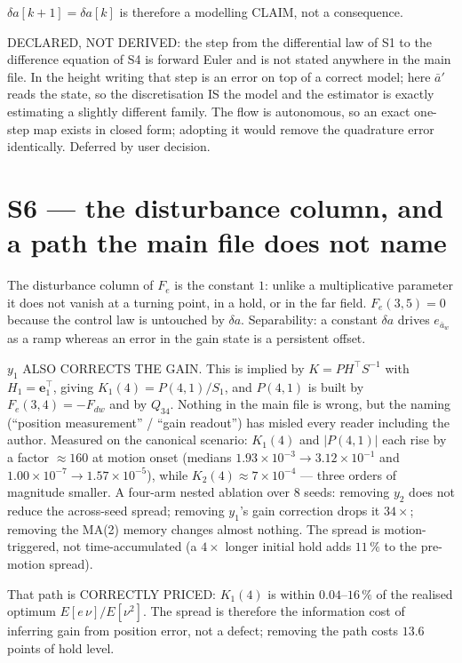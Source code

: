 \documentclass[11pt,a4paper,fontset=none]{ctexart}
\newcommand{\ba}{\bar{a}}
\begin{document}
$\delta a[k+1] = \delta a[k]$ is therefore a modelling CLAIM, not a consequence.

DECLARED, NOT DERIVED: the step from the differential law of S1 to the
difference equation of S4 is forward Euler and is not stated anywhere in the
main file. In the height writing that step is an error on top of a correct
model; here $\ba'$ reads the state, so the discretisation IS the model and the
estimator is exactly estimating a slightly different family. The flow is
autonomous, so an exact one-step map exists in closed form; adopting it would
remove the quadrature error identically. Deferred by user decision.

\section*{S6 --- the disturbance column, and a path the main file does not name}

The disturbance column of $F_e$ is the constant $1$: unlike a multiplicative
parameter it does not vanish at a turning point, in a hold, or in the far
field. $F_e(3,5) = 0$ because the control law is untouched by $\delta a$.
Separability: a constant $\delta a$ drives $e_{\ba_w}$ as a ramp whereas an
error in the gain state is a persistent offset.

$y_1$ ALSO CORRECTS THE GAIN. This is implied by $K = PH^{\top}S^{-1}$ with
$H_1 = \mathbf{e}_1^{\top}$, giving $K_1(4) = P(4,1)/S_1$, and $P(4,1)$ is built
by $F_e(3,4) = -F_{dw}$ and by $Q_{34}$. Nothing in the main file is wrong, but
the naming (``position measurement'' / ``gain readout'') has misled every
reader including the author. Measured on the canonical scenario:
$K_1(4)$ and $|P(4,1)|$ each rise by a factor $\approx 160$ at motion onset
(medians $1.93\times10^{-3} \to 3.12\times10^{-1}$ and
$1.00\times10^{-7} \to 1.57\times10^{-5}$), while $K_2(4) \approx 7\times10^{-4}$
--- three orders of magnitude smaller. A four-arm nested ablation over 8 seeds:
removing $y_2$ does not reduce the across-seed spread; removing $y_1$'s gain
correction drops it $34\times$; removing the MA(2) memory changes almost
nothing. The spread is motion-triggered, not time-accumulated (a $4\times$
longer initial hold adds $11\,\%$ to the pre-motion spread).

That path is CORRECTLY PRICED: $K_1(4)$ is within $0.04$--$16\,\%$ of the
realised optimum $E[e\,\nu]/E[\nu^{2}]$. The spread is therefore the
information cost of inferring gain from position error, not a defect; removing
the path costs $13.6$ points of hold level.
\end{document}
